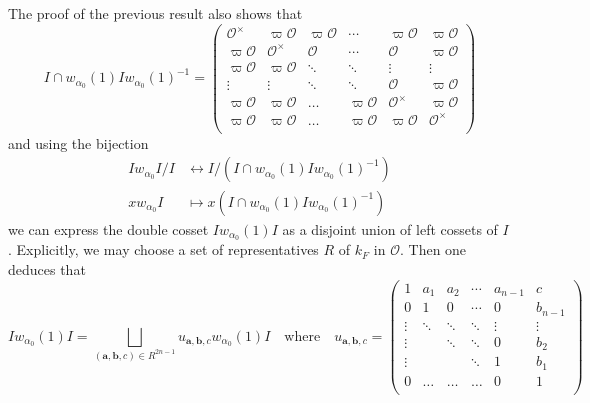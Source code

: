 \documentclass{article}
\newcommand{\cO}{\mathcal{O}}
\theoremstyle{plain}
\theoremstyle{definition}
\begin{document}
    The proof of the previous result also shows that 
    \begin{equation*}
        I\cap w_{\alpha_0}(1)I w_{\alpha_0}(1)^{-1}=\begin{pmatrix}
            \cO^\times&\varpi\cO&\varpi\cO&\cdots&\varpi\cO&\varpi\cO\\
            \varpi\cO&\cO^\times&\cO&\cdots&\cO&\varpi\cO\\
            \varpi\cO&\varpi\cO&\ddots&\ddots&\vdots&\vdots\\
            \vdots&\vdots&\ddots&\ddots&\cO&\varpi\cO\\
            \varpi\cO&\varpi\cO&\ldots&\varpi\cO&\cO^\times&\varpi\cO\\
           \varpi\cO&\varpi\cO&\ldots&\varpi\cO&\varpi\cO&\cO^\times\\
        \end{pmatrix}
    \end{equation*}
    and using the bijection 
    \begin{align*}
        Iw_{\alpha_0}I/I&\longleftrightarrow I/(I\cap w_{\alpha_0}(1)I w_{\alpha_0}(1)^{-1})\\
        xw_{\alpha_0}I&\longmapsto x(I\cap w_{\alpha_0}(1)I w_{\alpha_0}(1)^{-1})
    \end{align*}
    we can express the double cosset $Iw_{\alpha_0}(1)I$ as a disjoint union of left cossets of $I$. Explicitly, we may choose a set of representatives $R$ of $k_F$ in $\cO$. Then one deduces that
    \begin{equation*}
        Iw_{\alpha_0}(1)I=\bigsqcup_{(\mathbf{a},\mathbf{b},c)\in R^{2n-1}}u_{\mathbf{a},\mathbf{b},c}w_{\alpha_0}(1)I\quad\text{where}\quad u_{\mathbf{a},\mathbf{b},c}=\begin{pmatrix}
            1&a_1&a_2&\cdots&a_{n-1}&c\\
            0&1&0&\cdots&0&b_{n-1}\\
            \vdots&\ddots&\ddots&\ddots&\vdots&\vdots\\
            \vdots&&\ddots&\ddots&0&b_2\\
            \vdots&&&\ddots&1&b_1\\
            0&\ldots&\ldots&\ldots&0&1\\
        \end{pmatrix}
    \end{equation*}
\end{document}
